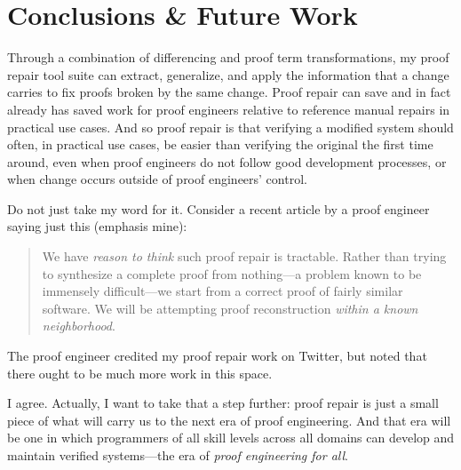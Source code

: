 \chapter{Conclusions \& Future Work}
\label{chapt:conclusions}

Through a combination of differencing and proof term transformations,
my proof repair tool suite can extract, generalize, and apply the information that a change carries to fix proofs broken by the same change.
Proof repair can save and in fact already has saved work for proof engineers relative to reference manual repairs in practical use cases.
And so proof repair is  that verifying a modified system should often, in practical use cases, be easier than verifying the original the first time around,
even when proof engineers do not follow good development processes,
or when change occurs outside of proof engineers' control.

Do not just take my word for it.
Consider a recent article by a proof engineer saying just this (emphasis mine): %

\begin{quote}
We have \textit{reason to think} such proof repair is tractable. Rather than trying to synthesize a complete proof from nothing---a problem known to be immensely difficult---we 
start from a correct proof of fairly similar software. We will be attempting proof reconstruction \textit{within a known neighborhood}.
\end{quote}
The proof engineer credited my proof repair work on Twitter, %
but noted that there ought to be much more work in this space.

I agree.
Actually, I want to take that a step further:
proof repair is just a small piece of what will carry us to the next era of proof engineering.
And that era will be one in which programmers of all skill levels across all domains can develop and maintain verified systems---the era of
\textit{proof engineering for all}.


